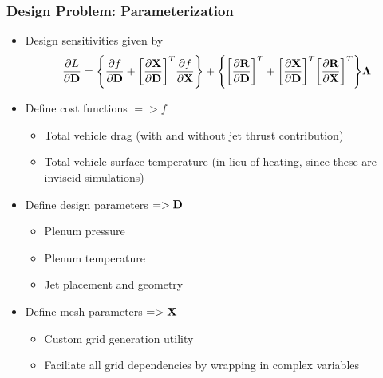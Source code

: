 \documentclass{beamer}
\begin{document}
\begin{frame}
  \frametitle{Design Problem: Parameterization}
  \begin{itemize}
    \item Design sensitivities given by
      \[
        \frac{\partial L}{\partial \mathbf D} =
        \Bigg\{\frac{\partial f}{\partial \mathbf D} + \bigg[\frac{\partial \mathbf X}{\partial \mathbf D}\bigg]^T
        \frac{\partial f}{\partial \mathbf X}\Bigg\} + \Bigg\{\bigg[\frac{\partial \mathbf R}{\partial \mathbf D}\bigg]^T
        + \bigg[\frac{\partial \mathbf X}{\partial \mathbf D}\bigg]^T\bigg[ \frac{\partial \mathbf R}{\partial \mathbf X}\bigg]^T\Bigg\}\mathbf \Lambda
      \]
    \item Define cost functions $=> f$
      \begin{itemize}
        \item Total vehicle drag (with and without jet thrust contribution)
        \item Total vehicle surface temperature (in lieu of heating, since
          these are inviscid simulations)
      \end{itemize}
    \item Define design parameters $=> \mathbf D$
      \begin{itemize}
        \item Plenum pressure
        \item Plenum temperature
        \item Jet placement and geometry
      \end{itemize}
    \item Define mesh parameters $=> \mathbf X$
      \begin{itemize}
        \item Custom grid generation utility
        \item Faciliate all grid dependencies by wrapping in complex variables
      \end{itemize}

  \end{itemize}
\end{frame}
\end{document}
